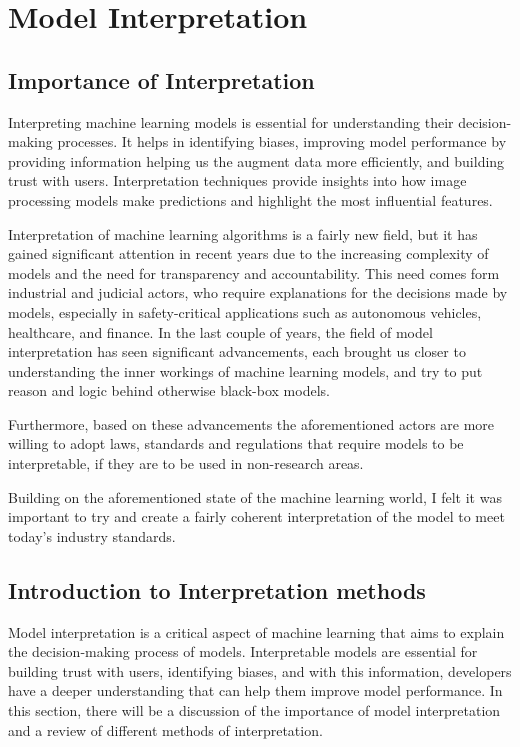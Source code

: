
\section{Model Interpretation}\label{sec:model-interpretation}

\subsection{Importance of Interpretation}\label{subsec:importance-of-interpretation}

Interpreting machine learning models is essential for understanding their decision-making processes.
It helps in identifying biases, improving model performance by providing information helping us the augment data more efficiently, and building trust with users.
Interpretation techniques provide insights into how image processing models make predictions and highlight the most influential features.

Interpretation of machine learning algorithms is a fairly new field, but it has gained significant attention
in recent years due to the increasing complexity of models and the need for transparency and accountability.
This need comes form industrial and judicial actors, who require explanations for the decisions made by models,
especially in safety-critical applications such as autonomous vehicles, healthcare, and finance.
In the last couple of years, the field of model interpretation has seen significant advancements, each brought
us closer to understanding the inner workings of machine learning models, and try to put reason and logic behind
otherwise black-box models.

Furthermore, based on these advancements the aforementioned actors are more willing to adopt laws,
standards and regulations that require models to be interpretable,
if they are to be used in non-research areas.

Building on the aforementioned state of the machine learning world, I felt it was important to try
and create a fairly coherent interpretation of the model to meet today's industry standards.

\subsection{Introduction to Interpretation methods}\label{subsec:introduction-to-interpretation-methods}

Model interpretation is a critical aspect of machine learning that aims to explain the decision-making process of models. %
Interpretable models are essential for building trust with users, identifying biases, and with this information,
developers have a deeper understanding that can help them improve model performance.
In this section, there will be a discussion of the importance of model interpretation and a review of different methods of interpretation.

